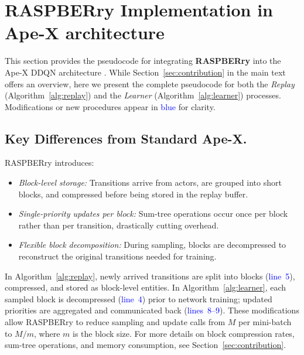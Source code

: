 \documentclass[10pt]{article} %
\begin{document}
\newpage

\appendix

\section{RASPBERry Implementation in Ape-X architecture}
\label{apx:raspberry_code}
This section provides the pseudocode for integrating \textbf{RASPBERry} into the Ape-X DDQN architecture \citep{DistributedPrioritizedExperience_horgan_2018}.
While Section~\ref{sec:contribution} in the main text offers an overview, here we present the complete pseudocode for both the \emph{Replay} (Algorithm~\ref{alg:replay}) and the \emph{Learner} (Algorithm~\ref{alg:learner}) processes.  
Modifications or new procedures appear in \textcolor{blue}{blue} for clarity.

\subsection{Key Differences from Standard Ape-X.}
RASPBERry introduces:
\begin{itemize}[leftmargin=*]
    \item \emph{Block-level storage:} Transitions arrive from actors, are grouped into short blocks, and compressed before being stored in the replay buffer.
    \item \emph{Single-priority updates per block:} Sum-tree operations occur once per block rather than per transition, drastically cutting overhead.
    \item \emph{Flexible block decomposition:} During sampling, blocks are decompressed to reconstruct the original transitions needed for training.
\end{itemize}

In Algorithm~\ref{alg:replay}, newly arrived transitions are split into blocks (\textcolor{blue}{line~5}), compressed, and stored as block-level entities.
In Algorithm~\ref{alg:learner}, each sampled block is decompressed (\textcolor{blue}{line~4}) prior to network training; updated priorities are aggregated and communicated back (\textcolor{blue}{lines~8--9}). 
These modifications allow RASPBERry to reduce sampling and update calls from $M$ per mini-batch to $M/m$, where $m$ is the block size.  
For more details on block compression rates, sum-tree operations, and memory consumption, see Section~\ref{sec:contribution}.
\end{document}
